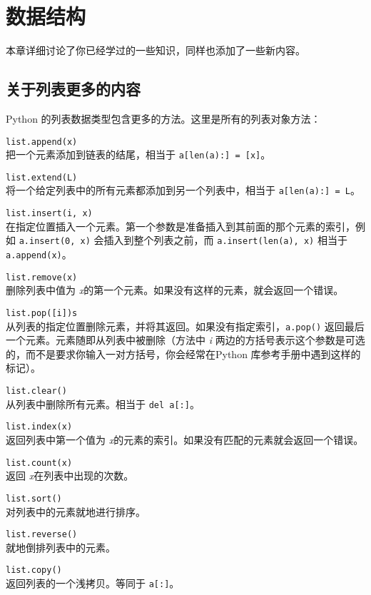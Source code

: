 \chapter{数据结构\label{DataStructures}}
本章详细讨论了你已经学过的一些知识，同样也添加了一些新内容。
\section{关于列表更多的内容}
Python 的列表数据类型包含更多的方法。这里是所有的列表对象方法：
\begin{compactdesc}
  \item[\texttt{list.append(x)}] \mbox{}\\把一个元素添加到链表的结尾，相当于 \texttt{a[len(a):] = [x]}。
  \item[\texttt{list.extend(L)}] \mbox{}\\将一个给定列表中的所有元素都添加到另一个列表中，相当于 \texttt{a[len(a):] = L}。
  \item[\texttt{list.insert(i, x)}] \mbox{}\\在指定位置插入一个元素。第一个参数是准备插入到其前面的那个元素的索引，例如 \texttt{a.insert(0, x)} 会插入到整个列表之前，而 \texttt{a.insert(len(a), x)} 相当于\texttt{a.append(x)}。
  \item[\texttt{list.remove(x)}] \mbox{}\\删除列表中值为 \emph{x}的第一个元素。如果没有这样的元素，就会返回一个错误。
  \item[\texttt{list.pop([i])s}] \mbox{}\\从列表的指定位置删除元素，并将其返回。如果没有指定索引，\texttt{a.pop()} 返回最后一个元素。元素随即从列表中被删除（方法中 \emph{i} 两边的方括号表示这个参数是可选的，而不是要求你输入一对方括号，你会经常在Python 库参考手册中遇到这样的标记）。
  \item[\texttt{list.clear()}] \mbox{}\\从列表中删除所有元素。相当于 \texttt{del a[:]}。
  \item[\texttt{list.index(x)}] \mbox{}\\返回列表中第一个值为 \emph{x}的元素的索引。如果没有匹配的元素就会返回一个错误。
  \item[\texttt{list.count(x)}] \mbox{}\\返回 \emph{x}在列表中出现的次数。
  \item[\texttt{list.sort()}] \mbox{}\\对列表中的元素就地进行排序。
  \item[\texttt{list.reverse()}] \mbox{}\\就地倒排列表中的元素。
  \item[\texttt{list.copy()}] \mbox{}\\返回列表的一个浅拷贝。等同于 \texttt{a[:]}。
\end{compactdesc}
